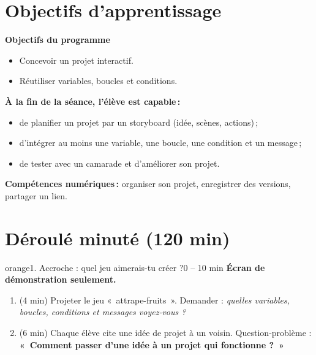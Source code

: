 \documentclass[11pt,a4paper]{article}
\begin{document}
\section{Objectifs d'apprentissage}
\begin{tcolorbox}[colback=gray!8,colframe=gray!60!black,arc=1mm,boxrule=0.5pt]
\textbf{Objectifs du programme}
\begin{itemize}
 \item Concevoir un projet interactif.
 \item Réutiliser variables, boucles et conditions.
\end{itemize}
\textbf{À la fin de la séance, l'élève est capable\,:}
\begin{itemize}
 \item de planifier un projet par un storyboard (idée, scènes, actions)\,;
 \item d'intégrer au moins une variable, une boucle, une condition et un message\,;
 \item de tester avec un camarade et d'améliorer son projet.
\end{itemize}
\textbf{Compétences numériques\,:} organiser son projet, enregistrer des versions, partager un lien.
\end{tcolorbox}

\section{Déroulé minuté (120 min)}

\begin{etape}{orange}{1. Accroche : quel jeu aimerais-tu créer ?}{0 -- 10 min}
\textbf{Écran de démonstration seulement.}
\begin{enumerate}
 \item (4 min) Projeter le jeu «~attrape-fruits~». Demander : \emph{quelles variables, boucles, conditions et messages voyez-vous ?}
 \item (6 min) Chaque élève cite une idée de projet à un voisin. Question-problème : \textbf{«~Comment passer d'une idée à un projet qui fonctionne ?~»}
\end{enumerate}
\end{etape}
\end{document}
